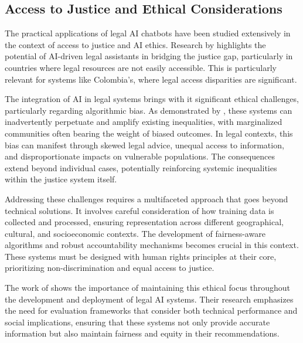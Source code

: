 \subsection{Access to Justice and Ethical Considerations}
The practical applications of legal AI chatbots have been studied extensively 
in the context of access to justice and AI ethics. Research by \cite{chakraborty2023revolutionizing} 
highlights the potential of AI-driven legal assistants in bridging the justice gap, particularly 
in countries where legal resources are not easily accessible. This is particularly relevant for 
systems like Colombia's, where legal access disparities are significant. 

The integration of AI in legal systems brings with it significant ethical challenges, particularly 
regarding algorithmic bias. As demonstrated by \cite{Min_bias}, these systems can inadvertently 
perpetuate and amplify existing inequalities, with marginalized communities often bearing the weight 
of biased outcomes. In legal contexts, this bias can manifest through skewed legal advice, 
unequal access to information, and disproportionate impacts on vulnerable populations. The 
consequences extend beyond individual cases, potentially reinforcing systemic inequalities 
within the justice system itself.

Addressing these challenges requires a multifaceted approach that goes beyond technical solutions. 
It involves careful consideration of how training data is collected and processed, ensuring 
representation across different geographical, cultural, and socioeconomic contexts. The development 
of fairness-aware algorithms and robust accountability mechanisms becomes crucial in this context. 
These systems must be designed with human rights principles at their core, prioritizing 
non-discrimination and equal access to justice.

The work of \cite{guha2023legalbench} shows the importance of maintaining this ethical 
focus throughout the development and deployment of legal AI systems. Their research emphasizes 
the need for evaluation frameworks that consider both technical performance and social implications, 
ensuring that these systems not only provide accurate information but also maintain fairness 
and equity in their recommendations.

